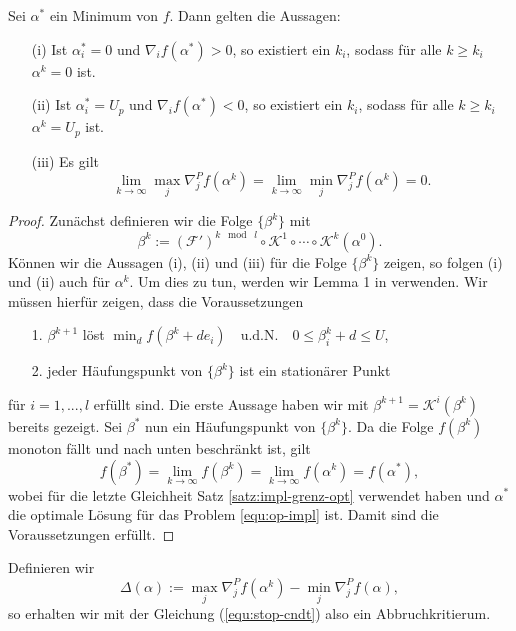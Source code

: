 \begin{satz}
	Sei $\alpha^*$ ein Minimum von $f$. Dann gelten die Aussagen:
\begin{itemize}
\item[(i)] Ist $\alpha^*_i = 0$ und $\nabla_i f(\alpha^*) > 0$, so existiert ein $k_i$, sodass für alle $k \geq k_i$ $\alpha^k = 0$ ist.
\item[(ii)] Ist $\alpha^*_i = U_p$ und $\nabla_i f(\alpha^*) < 0$, so existiert ein $k_i$, sodass für alle $k \geq k_i$ $\alpha^k = U_p$ ist.
\item[(iii)] Es gilt 
\begin{equation}
\label{equ:stop-cndt}
	\lim_{k \rightarrow \infty} \max_{j} \nabla_j^P f(\alpha^k) = 
	\lim_{k \rightarrow \infty} \min_{j} \nabla_j^P f(\alpha^k) = 0.
\end{equation}
\end{itemize}
\end{satz}
\begin{proof}
	Zunächst definieren wir die Folge  $\{\beta^k\}$ mit
	$$
	\beta^k := (\mathcal{F}')^{k \; \bmod \; l} \circ \mathcal{K}^1 \circ \cdots \circ \mathcal{K}^k(\alpha^0).
	$$
	Können wir die Aussagen (i), (ii) und (iii) für die Folge $\{\beta^k\}$ zeigen, so folgen (i) und (ii) auch für $\alpha^k$. Um dies zu tun, werden wir Lemma 1 in \cite{hcl-ddms-08} verwenden. Wir müssen hierfür zeigen, dass die Voraussetzungen
	\begin{itemize}
		\item[1.] $\beta^{k+1}$ löst $\min_{d} f(\beta^k+ de_i) \quad \text{u.d.N.} \quad 0 \leq \beta^k_i + d \leq U$,
		\item[2.] jeder Häufungspunkt von $\{\beta^k\}$ ist ein stationärer Punkt
	\end{itemize}
	für $i=1,...,l$ erfüllt sind. Die erste Aussage haben wir mit $\beta^{k+1} = \mathcal{K}^i(\beta^{k})$ bereits gezeigt. Sei $\beta^*$ nun ein Häufungspunkt von $\{\beta^k\}$. Da die Folge ${f(\beta^k)}$ monoton fällt und nach unten beschränkt ist, gilt 
	$$
	f(\beta^*) = \lim_{k \rightarrow \infty} f(\beta^k) = \lim_{k \rightarrow \infty} f(\alpha^k) = f(\alpha^*),
	$$
	wobei für die letzte Gleichheit Satz \ref{satz:impl-grenz-opt} verwendet haben und $\alpha^*$ die optimale Lösung für das Problem \ref{equ:op-impl} ist. Damit sind die Voraussetzungen erfüllt. 
\end{proof}

Definieren wir 
\begin{equation}
	\Delta(\alpha) := \max_{j} \nabla_j^P f(\alpha^k) - \min_{j} \nabla_j^P f(\alpha),
\end{equation}
so erhalten wir mit der Gleichung (\ref{equ:stop-cndt}) also ein Abbruchkritierum. 

